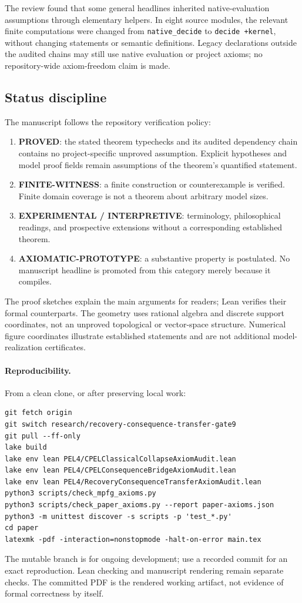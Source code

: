 The review found that some general headlines inherited native-evaluation assumptions
through elementary helpers. In eight source modules, the relevant finite computations
were changed from \texttt{native\_decide} to \texttt{decide +kernel}, without
changing statements or semantic definitions. Legacy declarations outside the audited
chains may still use native evaluation or project axioms; no repository-wide
axiom-freedom claim is made.

\subsection{Status discipline}
The manuscript follows the repository verification policy:
\begin{enumerate}[label=(\arabic*)]
\item \textbf{PROVED}: the stated theorem typechecks and its audited dependency
chain contains no project-specific unproved assumption. Explicit hypotheses
and model proof fields remain assumptions of the theorem's quantified statement.
\item \textbf{FINITE-WITNESS}: a finite construction or counterexample is
verified. Finite domain coverage is not a theorem about arbitrary model sizes.
\item \textbf{EXPERIMENTAL / INTERPRETIVE}: terminology, philosophical readings,
and prospective extensions without a corresponding established theorem.
\item \textbf{AXIOMATIC-PROTOTYPE}: a substantive property is postulated.
No manuscript headline is promoted from this category merely because it compiles.
\end{enumerate}
The proof sketches explain the main arguments for readers; Lean verifies their
formal counterparts. The geometry uses rational algebra and discrete support
coordinates, not an unproved topological or vector-space structure. Numerical figure
coordinates illustrate established statements and are not additional model-realization
certificates.

\paragraph{Reproducibility.}
From a clean clone, or after preserving local work:
\begin{verbatim}
git fetch origin
git switch research/recovery-consequence-transfer-gate9
git pull --ff-only
lake build
lake env lean PEL4/CPELClassicalCollapseAxiomAudit.lean
lake env lean PEL4/CPELConsequenceBridgeAxiomAudit.lean
lake env lean PEL4/RecoveryConsequenceTransferAxiomAudit.lean
python3 scripts/check_mpfg_axioms.py
python3 scripts/check_paper_axioms.py --report paper-axioms.json
python3 -m unittest discover -s scripts -p 'test_*.py'
cd paper
latexmk -pdf -interaction=nonstopmode -halt-on-error main.tex
\end{verbatim}
The mutable branch is for ongoing development; use a recorded commit for an exact
reproduction. Lean checking and manuscript rendering remain separate checks. The
committed PDF is the rendered working artifact, not evidence of formal correctness by
itself.
